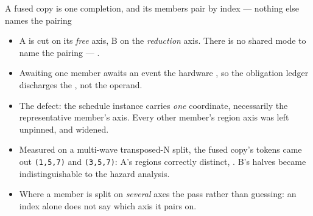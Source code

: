 \begin{frame}{A fused copy is one completion, and its members pair by index --- nothing else names the pairing}
\begin{center}
\end{center}
\begin{itemize}
\item A is cut on its \emph{free} axis, B on the \emph{reduction} axis. There is no shared mode to
      name the pairing --- .
\item Awaiting one member awaits an event the hardware , so the
      obligation ledger discharges the , not the operand.
\item The defect: the schedule instance carries \emph{one} coordinate, necessarily the
      representative member's axis. Every other member's region axis was left unpinned, and widened.
\item Measured on a multi-wave transposed-N split, the fused copy's tokens came out
      \texttt{(1,5,7)} and \texttt{(3,5,7)}: A's regions correctly distinct, . B's halves became indistinguishable to the hazard analysis.
\item Where a member is split on \emph{several} axes the pass  rather than guessing:
      an index alone does not say which axis it pairs on.
\end{itemize}
\end{frame}
